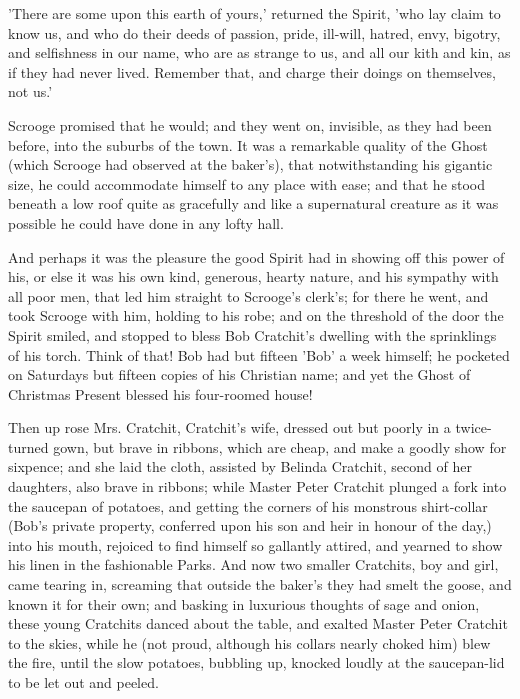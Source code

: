 'There are some upon this earth of yours,' returned the Spirit, 'who
lay claim to know us, and who do their deeds of passion, pride,
ill-will, hatred, envy, bigotry, and selfishness in our name, who are as
strange to us, and all our kith and kin, as if they had never lived.
Remember that, and charge their doings on themselves, not us.'

Scrooge promised that he would; and they went on, invisible, as they had
been before, into the suburbs of the town. It was a remarkable quality
of the Ghost (which Scrooge had observed at the baker's), that
notwithstanding his gigantic size, he could accommodate himself to any
place with ease; and that he stood beneath a low roof quite as
gracefully and like a supernatural creature as it was possible he could
have done in any lofty hall.

And perhaps it was the pleasure the good Spirit had in showing off this
power of his, or else it was his own kind, generous, hearty nature, and
his sympathy with all poor men, that led him straight to Scrooge's
clerk's; for there he went, and took Scrooge with him, holding to his
robe; and on the threshold of the door the Spirit smiled, and stopped to
bless Bob Cratchit's dwelling with the sprinklings of his torch. Think
of that! Bob had but fifteen 'Bob' a week himself; he pocketed on
Saturdays but fifteen copies of his Christian name; and yet the Ghost of
Christmas Present blessed his four-roomed house!

Then up rose Mrs. Cratchit, Cratchit's wife, dressed out but poorly in a
twice-turned gown, but brave in ribbons, which are cheap, and make a
goodly show for sixpence; and she laid the cloth, assisted by Belinda
Cratchit, second of her daughters, also brave in ribbons; while Master
Peter Cratchit plunged a fork into the saucepan of potatoes, and getting
the corners of his monstrous shirt-collar (Bob's private property,
conferred upon his son and heir in honour of the day,) into his mouth,
rejoiced to find himself so gallantly attired, and yearned to show his
linen in the fashionable Parks. And now two smaller Cratchits, boy and
girl, came tearing in, screaming that outside the baker's they had smelt
the goose, and known it for their own; and basking in luxurious thoughts
of sage and onion, these young Cratchits danced about the table, and
exalted Master Peter Cratchit to the skies, while he (not proud,
although his collars nearly choked him) blew the fire, until the slow
potatoes, bubbling up, knocked loudly at the saucepan-lid to be let out
and peeled.

